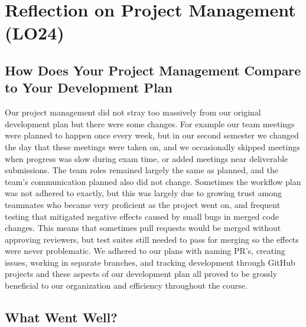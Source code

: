 \documentclass{article}
\begin{document}
\section{Reflection on Project Management (LO24)}

\subsection{How Does Your Project Management Compare to Your Development Plan}

Our project management did not stray too massively from our original development plan but there were some changes. For example our team meetings were planned to happen once every week, but in our second semester we changed the day that these meetings were taken on, and we occasionally skipped meetings when progress was slow during exam time, or added meetings near deliverable submissions. The team roles remained largely the same as planned, and the team's communication planned also did not change. Sometimes the workflow plan was not adhered to exactly, but this was largely due to growing trust among teammates who became very proficient as the project went on, and frequent testing that mitigated negative effects caused by small bugs in merged code changes. This means that sometimes pull requests would be merged without approving reviewers, but test suites still needed to pass for merging so the effects were never problematic. We adhered to our plans with naming PR's, creating issues, working in separate branches, and tracking development through GitHub projects and these aspects of our development plan all proved to be grossly beneficial to our organization and efficiency throughout the course.


\subsection{What Went Well?}
\end{document}
